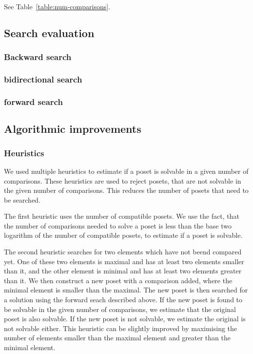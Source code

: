 \documentclass[10pt,journal,compsoc]{IEEEtran}
\begin{document}
See Table~\ref{table:num-comparisons}.


\subsection{Search evaluation}
\subsubsection{Backward search}
\subsubsection{bidirectional search}
\subsubsection{forward search}

\subsection{Algorithmic improvements}

\subsubsection{Heuristics}

We used multiple heuristics to estimate if a poset is solvable in a given number of comparisons.
These heuristics are used to reject posets, that are not solvable in the given number of comparisons.
This reduces the number of posets that need to be searched.

The first heuristic uses the number of compatible posets.
We use the fact, that the number of comparisons needed to solve a poset is less than the base two logarithm of the number of compatible posets,
to estimate if a poset is solvable.

The second heuristic searches for two elements which have not beend compared yet.
One of these two elements is maximal and has at least two elements smaller than it,
and the other element is minimal and has at least two elements greater than it.
We then construct a new poset with a comparison added, where the minimal element is smaller than the maximal.
The new poset is then searched for a solution using the forward seach described above.
If the new poset is found to be solvable in the given number of comparisons, we estimate that the original poset is also solvable.
If the new poset is not solvable, we estimate the original is not solvable either.
This heuristic can be slightly improved by maximising the number of elements smaller than the maximal element and greater than the minimal element.
\end{document}
